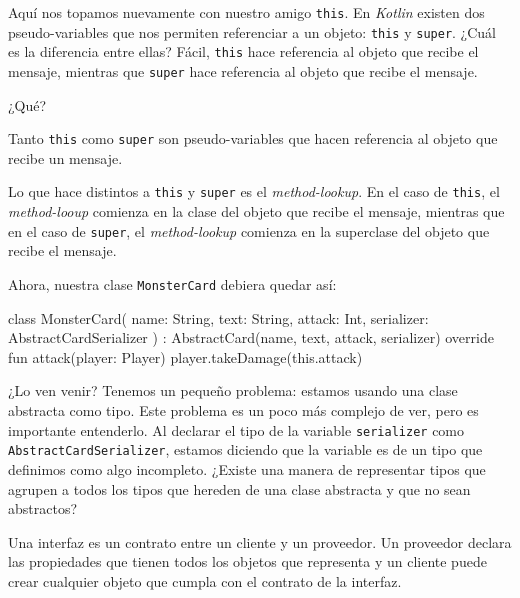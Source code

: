  Aquí nos topamos nuevamente con nuestro amigo \texttt{this}.
  En \textit{Kotlin} existen dos pseudo-variables que nos permiten referenciar a un objeto: 
  \texttt{this} y \texttt{super}.
  ¿Cuál es la diferencia entre ellas?
  Fácil, \texttt{this} hace referencia al objeto que recibe el mensaje, mientras que \texttt{super}
  hace referencia al objeto que recibe el mensaje.

  \begin{center}
    ¿Qué?
  \end{center}

  \begin{defaultbox}
    Tanto \texttt{this} como \texttt{super} son pseudo-variables que hacen referencia al objeto que
    recibe un mensaje.

    Lo que hace distintos a \texttt{this} y \texttt{super} es el \textit{method-lookup}.
    En el caso de \texttt{this}, el \textit{method-looup} comienza en la clase del objeto que 
    recibe el mensaje, mientras que en el caso de \texttt{super}, el \textit{method-lookup} comienza 
    en la superclase del objeto que recibe el mensaje.
  \end{defaultbox}

  Ahora, nuestra clase \texttt{MonsterCard} debiera quedar así:

  \begin{kotlin}
    class MonsterCard(
      name: String,
      text: String,
      attack: Int,
      serializer: AbstractCardSerializer
    ) : AbstractCard(name, text, attack, serializer) {
      override fun attack(player: Player) {
        player.takeDamage(this.attack)
      }
    }
  \end{kotlin}

  ¿Lo ven venir?
  Tenemos un pequeño problema: estamos usando una clase abstracta como tipo.
  Este problema es un poco más complejo de ver, pero es importante entenderlo.
  Al declarar el tipo de la variable \texttt{serializer} como \texttt{AbstractCardSerializer},
  estamos diciendo que la variable es de un tipo que definimos como algo incompleto.
  ¿Existe una manera de representar tipos que agrupen a todos los tipos que hereden de una clase
  abstracta y que no sean abstractos?

  \begin{defaultbox}[Interfaces]
    Una interfaz es un contrato entre un cliente y un proveedor.
    Un proveedor declara las propiedades que tienen todos los objetos que representa y un cliente
    puede crear cualquier objeto que cumpla con el contrato de la interfaz.
  \end{defaultbox}

